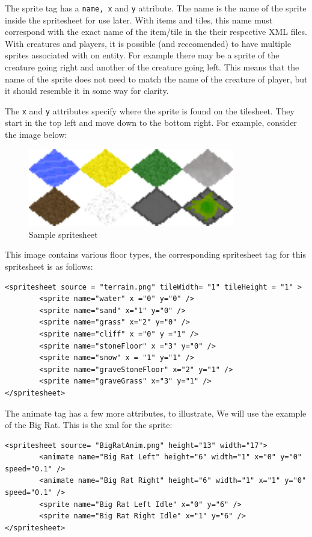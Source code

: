 \documentclass{book}
\begin{document}
The sprite tag has a \texttt{name, x} and \texttt{y} attribute. The name is the name of the sprite inside the spritesheet for use later. With items and tiles, this name must correspond with the exact name of the item/tile in the their respective XML files. With creatures and players, it is possible (and reccomended) to have multiple sprites associated with on entity. For example there may be a sprite of the creature going right and another of the creature going left. This means that the name of the sprite does not need to match the name of the creature of player, but it should resemble it in some way for clarity.

The \texttt{x} and \texttt{y} attributes specify where the sprite is found on the tilesheet. They start in the top left and move down to the bottom right. For example, consider the image below:

\begin{figure}[ht!]
		\centering
		\includegraphics[width=90mm]{terrain.png}
		\caption{Sample spritesheet}
\end{figure}

This image contains various floor types, the corresponding spritesheet tag for this spritesheet is as follows:

\begin{verbatim}
<spritesheet source = "terrain.png" tileWidth= "1" tileHeight = "1" >
		<sprite name="water" x ="0" y="0" />
		<sprite name="sand" x="1" y="0" />
		<sprite name="grass" x="2" y="0" />
		<sprite name="cliff" x ="0" y ="1" />
		<sprite name="stoneFloor" x ="3" y="0" />
		<sprite name="snow" x = "1" y="1" />
		<sprite name="graveStoneFloor" x="2" y="1" />
		<sprite name="graveGrass" x="3" y="1" />
</spritesheet>
\end{verbatim}

The animate tag has a few more attributes, to illustrate, We will use the example of the Big Rat. This is the xml for the sprite:
\begin{verbatim}
<spritesheet source= "BigRatAnim.png" height="13" width="17">
		<animate name="Big Rat Left" height="6" width="1" x="0" y="0" speed="0.1" />
		<animate name="Big Rat Right" height="6" width="1" x="1" y="0" speed="0.1" />
		<sprite name="Big Rat Left Idle" x="0" y="6" />
		<sprite name="Big Rat Right Idle" x="1" y="6" />
</spritesheet>
\end{verbatim}
\end{document}
